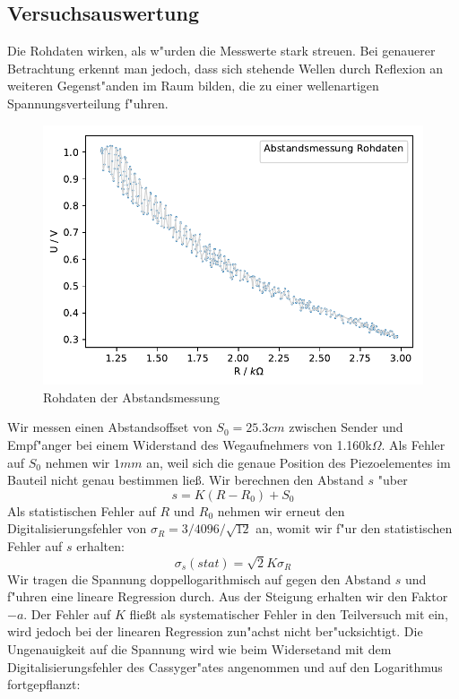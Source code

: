 \documentclass[12pt,a4paper]{article}
\begin{document}
\subsection{Versuchsauswertung}
Die Rohdaten wirken, als w"urden die Messwerte stark streuen. Bei genauerer Betrachtung erkennt man jedoch, dass sich stehende Wellen durch Reflexion an weiteren Gegenst"anden im Raum bilden, die zu einer wellenartigen Spannungsverteilung f"uhren.
\begin{figure}[H]
	\centering
	\includegraphics[scale=1]{Python/Abstandsmessung_Rohdaten3.pdf}
	\caption{Rohdaten der Abstandsmessung}
	\label{Abstandskal_Rohdaten}
\end{figure}
Wir messen einen Abstandsoffset von $S_0=25.3cm$ zwischen Sender und Empf"anger bei einem Widerstand des Wegaufnehmers von 1.160k$\Omega$. Als Fehler auf $S_0$ nehmen wir $1mm$ an, weil sich die genaue Position des Piezoelementes im Bauteil nicht genau bestimmen lie\ss. Wir berechnen den Abstand $s$ "uber
\begin{equation}
s=K(R-R_0)+S_0
\end{equation}
Als statistischen Fehler auf $R$ und $R_0$ nehmen wir erneut den Digitalisierungsfehler  von $\sigma_R=3/4096/\sqrt{12}$ an, womit wir f"ur den statistischen Fehler auf $s$ erhalten:
\begin{equation}
\sigma_s(stat)=\sqrt{2}K\sigma_R
\end{equation}
Wir tragen die Spannung doppellogarithmisch auf gegen den Abstand $s$ und f"uhren eine lineare Regression durch. Aus der Steigung erhalten wir den Faktor $-a$.
Der Fehler auf $K$ flie\ss t als systematischer Fehler in den Teilversuch mit ein, wird jedoch bei der linearen Regression zun"achst nicht ber"ucksichtigt. Die Ungenauigkeit auf die Spannung wird wie beim Widersetand mit dem Digitalisierungsfehler des Cassyger"ates angenommen und auf den Logarithmus fortgepflanzt:
\end{document}
